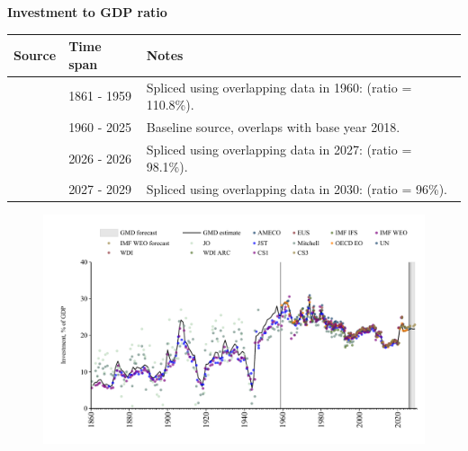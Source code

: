 \documentclass[12pt,a4paper,landscape]{article}
\begin{document}
\begin{adjustbox}{max totalsize={\paperwidth}{\paperheight},center}
\begin{minipage}[t][\textheight][t]{\textwidth}
\vspace*{0.5cm}
{}
\begin{center}
{\Large\bfseries Investment to GDP ratio}
\end{center}
\vspace{0.5cm}
\begin{table}[H]
\centering
\small
\begin{tabular}{|l|l|l|}
\hline
\textbf{Source} & \textbf{Time span} & \textbf{Notes} \\
\hline
\rowcolor{white}\cite{CS1_ITA}& 1861 - 1959 &Spliced using overlapping data in 1960: (ratio = 110.8\%). \\
\rowcolor{lightgray}\cite{OECD_EO}& 1960 - 2025 &Baseline source, overlaps with base year 2018. \\
\rowcolor{white}\cite{AMECO}& 2026 - 2026 &Spliced using overlapping data in 2027: (ratio = 98.1\%). \\
\rowcolor{lightgray}\cite{IMF_WEO_forecast}& 2027 - 2029 &Spliced using overlapping data in 2030: (ratio = 96\%). \\
\hline
\end{tabular}
\end{table}
\begin{figure}[H]
\centering
\includegraphics[width=\textwidth,height=0.6\textheight,keepaspectratio]{graphs/ITA_inv_GDP.pdf}
\end{figure}
\end{minipage}
\end{adjustbox}
\end{document}
